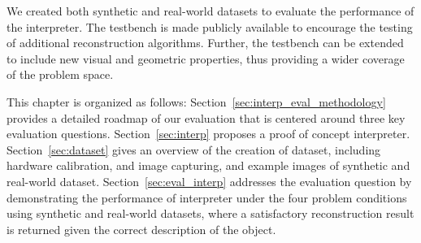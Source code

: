 We created both synthetic and real-world datasets to evaluate the performance of the interpreter. The testbench is made publicly available to encourage the testing of additional reconstruction algorithms. Further, the testbench can be extended to include new visual and geometric properties, thus providing a wider coverage of the problem space.




This chapter is organized as follows: Section~\ref{sec:interp_eval_methodology} provides a detailed roadmap of our evaluation that is centered around three key evaluation questions. Section~\ref{sec:interp} proposes a proof of concept interpreter. Section~\ref{sec:dataset} gives an overview of the creation of dataset, including hardware calibration, and image capturing, and example images of synthetic and real-world dataset. Section~\ref{sec:eval_interp} addresses the evaluation question by demonstrating the performance of interpreter under the four problem conditions using synthetic and real-world datasets, where a satisfactory reconstruction result is returned given the correct description of the object.

